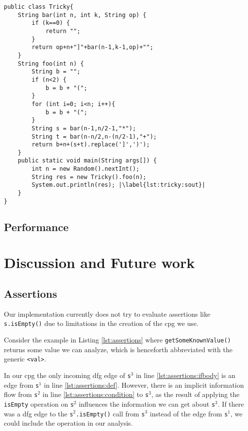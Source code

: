 \begin{lstlisting}[float, escapechar=|, numbers=right, caption=Tricky example, label=lst:tricky, captionpos=b, basicstyle=\small]
public class Tricky{
	String bar(int n, int k, String op) {
		if (k==0) {
			return "";
		}
		return op+n+"]"+bar(n-1,k-1,op)+"";
	}
	String foo(int n) {
		String b = "";
		if (n<2) {
			b = b + "(";
		}
		for (int i=0; i<n; i++){
			b = b + "(";
		}
		String s = bar(n-1,n/2-1,"*");
		String t = bar(n-n/2,n-(n/2-1),"+");
		return b+n+(s+t).replace(']',')');
	}
	public static void main(String args[]) {
		int n = new Random().nextInt();
		String res = new Tricky().foo(n);
		System.out.println(res); |\label{lst:tricky:sout}|
	}
}
\end{lstlisting}

\subsection{Performance}

\section{Discussion and Future work}

\subsection{Assertions}

Our implementation currently does not try to evaluate assertions like \lstinline|s.isEmpty()| due to limitations in the creation of the \ac{cpg} we use.

Consider the example in Listing \ref{lst:assertions} where \lstinline|getSomeKnownValue()| returns some value we can analyze, which is henceforth abbreviated with the generic \lstinline|<val>|.

In our \ac{cpg} the only incoming \ac{dfg} edge of \lstinline|s|$^3$ in line \ref{lst:assertions:ifbody} is an edge from \lstinline|s|$^1$ in line \ref{lst:assertions:def}. However, there is an implicit information flow from \lstinline|s|$^2$ in line \ref{lst:assertions:condition} to \lstinline|s|$^3$, as the result of applying the \lstinline|isEmpty| operation on \lstinline|s|$^2$ influences the information we can get about \lstinline|s|$^3$. If there was a \ac{dfg} edge to the \lstinline|s|$^2$\lstinline|.isEmpty()| call from \lstinline|s|$^3$ instead of the edge from \lstinline|s|$^1$, we could include the operation in our analysis.

